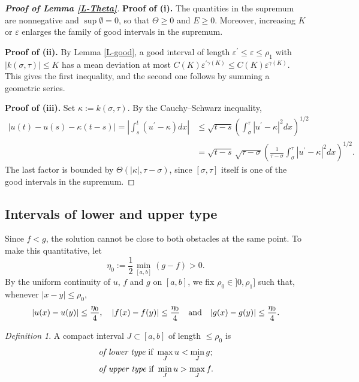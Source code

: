 \documentclass[reqno,12pt]{amsart}
\numberwithin{equation}{section}
\def\eps{\varepsilon}
\theoremstyle{remark}
\newtheorem{definition}[theorem]{Definition}
\begin{document}
\begin{proof}[\bf Proof of Lemma \ref{L-Theta}]
{\bf Proof of (i).} The quantities in the supremum are nonnegative and $\sup\emptyset=0$, so that $\Theta\geq0$ and $E\geq0$. Moreover, increasing $K$ or $\eps$ enlarges the family of good intervals in the supremum.

\medskip

{\bf Proof of (ii).} By Lemma \ref{L-good}, a good interval of length $\eps^\prime\leq\eps\leq\rho_1$ with $|k(\sigma,\tau)|\leq K$ has a mean deviation at most $C(K)\eps^{\prime\gamma(K)}\leq C(K)\eps^{\gamma(K)}$. This gives the first inequality, and the second one follows by summing a geometric series.

\medskip

{\bf Proof of (iii).} Set $\kappa:=k(\sigma,\tau)$. By the Cauchy--Schwarz inequality,
\begin{align*}
\big|u(t)-u(s)-\kappa(t-s)\big|=\left|\int_s^t(u^\prime-\kappa)dx\right|&\leq\sqrt{t-s}\left(\int_\sigma^\tau|u^\prime-\kappa|^2dx\right)^{1/2}\\
&=\sqrt{t-s}\,\sqrt{\tau-\sigma}\left(\frac1{\tau-\sigma}\int_\sigma^\tau|u^\prime-\kappa|^2dx\right)^{1/2}.
\end{align*}
The last factor is bounded by $\Theta(|\kappa|,\tau-\sigma)$, since $[\sigma,\tau]$ itself is one of the good intervals in the supremum.
\end{proof}

\subsection{Intervals of lower and upper type} Since $f<g$, the solution cannot be close to both obstacles at the same point. To make this quantitative, let
\begin{equation*}
\eta_0:=\frac12\min_{[a,b]}(g-f)>0.
\end{equation*}
By the uniform continuity of $u$, $f$ and $g$ on $[a,b]$, we fix $\rho_0\in]0,\rho_1]$ such that, whenever $|x-y|\leq\rho_0$,
\begin{equation*}
|u(x)-u(y)|\leq\frac{\eta_0}4,\quad|f(x)-f(y)|\leq\frac{\eta_0}4\quad\hbox{and}\quad|g(x)-g(y)|\leq\frac{\eta_0}4.
\end{equation*}

\begin{definition}\label{Def-types}
A compact interval $J\subset[a,b]$ of length $\leq\rho_0$ is
\begin{align*}
&\hbox{{\em of lower type} if }\max_Ju<\min_Jg;\\
&\hbox{{\em of upper type} if }\min_Ju>\max_Jf.
\end{align*}
\end{definition}
\end{document}
